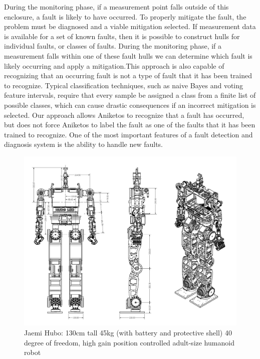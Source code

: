 During the monitoring phase, if a measurement point falls outside of this
enclosure, a fault is likely to have occurred. To properly mitigate the fault,
the problem must be diagnosed \cite{6100108} and a viable mitigation
selected. If measurement data is available for a set of known faults, then it
is possible to construct hulls for individual faults, or classes of
faults. During the monitoring phase, if a measurement falls within one of these
fault hulls we can determine which fault is likely occurring and apply a
mitigation.This approach is also capable of recognizing that an occurring fault
is not a type of fault that it has been trained to recognize. Typical
classification techniques, such as naive Bayes and voting feature
intervals\cite{Demiroz1997}, require that every sample be assigned a class from
a finite list of possible classes, which can cause drastic consequences if an
incorrect mitigation is selected. Our approach allows Aniketos to recognize
that a fault has occurred, but does not force Aniketos to label the fault as
one of the faults that it has been trained to recognize. One of the most
important features of a fault detection and diagnosis system is the ability to
handle new faults.

\begin{figure}[thpb]
  \centering
\includegraphics[width=1.0\columnwidth]{./pix/huboSch.png}
  \caption{Jaemi Hubo: 130cm tall 45kg (with battery and protective shell) 40
		degree of freedom, high gain position controlled adult-size humanoid robot
	}
  \label{fig:huboSch}
\end{figure}

